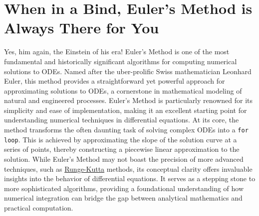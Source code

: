 \section{When in a Bind, Euler's Method is Always There for You}


Yes, him again, the Einstein of his era! Euler's Method is one of the most fundamental and historically significant algorithms for computing numerical solutions to ODEs. Named after the uber-prolific Swiss mathematician Leonhard Euler, this method provides a straightforward yet powerful approach for approximating solutions to ODEs, a cornerstone in mathematical modeling of natural and engineered processes. 
Euler's Method is particularly renowned for its simplicity and ease of implementation, making it an excellent starting point for understanding numerical techniques in differential equations. At its core, the method transforms the often daunting task of solving complex ODEs into a \texttt{for loop}. This is achieved by approximating the slope of the solution curve at a series of points, thereby constructing a piecewise linear approximation to the solution. While Euler's Method may not boast the precision of more advanced techniques, such as \href{https://docs.sciml.ai/DiffEqDocs/stable/solvers/ode_solve/#Explicit-Runge-Kutta-Methods}{Runge-Kutta} methods, its conceptual clarity offers invaluable insights into the behavior of differential equations. It serves as a stepping stone to more sophisticated algorithms, providing a foundational understanding of how numerical integration can bridge the gap between analytical mathematics and practical computation.



\bigskip


